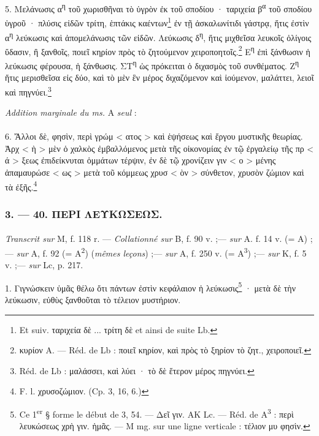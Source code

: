 \documentclass[a4paper, 11pt, oneside, polutonikogreek, french]{article}
\begin{document}
5. Μελάνωσις α\textsuperscript{η} τοῦ χωρισθῆναι τὸ ὑγρὸν ἐκ τοῦ σποδίου · ταριχεία β\textsuperscript{α} τοῦ σποδίου ὑγροῦ · πλύσις εἰδῶν τρίτη, ἑπτάκις καέντων\footnote{Et suiv. ταριχεία δὲ ... τρίτη δὲ et ainsi de suite Lb.} ἐν τῇ ἀσκαλωνίτιδι γάστρᾳ, ἥτις ἐστὶν α\textsuperscript{η} λεύκωσις καὶ ἀπομελάνωσις τῶν εἰδῶν. Λεύκωσις δ\textsuperscript{η}, ἥτις μιχθεῖσα λευκοῖς ὀλίγοις ὕδασιν, ἢ ξανθοῖς, ποιεῖ κηρίον πρὸς τὸ ζητούμενον χειροποητοῖς.\footnote{κυρίον A. --- Réd. de Lb : ποιεῖ κηρίον, καὶ πρὸς τὸ ξηρίον τὸ ζητ., χειροποιεῖ.} Ε\textsuperscript{η} ἐπὶ ξάνθωσιν ἡ λεύκωσις φέρουσα, ἡ ξάνθωσις. ΣΤ\textsuperscript{η} ὡς πρόκειται ὁ διχασμὸς τοῦ συνθέματος. Ζ\textsuperscript{η} ἥτις μερισθεῖσα εἰς δύο, καὶ τὸ μὲν ἓν μέρος διχαζόμενον καὶ ἰούμενον, μαλάττει, λειοῖ καὶ πηγνύει.\footnote{Réd. de Lb : μαλάσσει, καὶ λύει · τὸ δὲ ἕτερον μέρος πηγνύει.}
\begin{center}
\emph{Addition marginale du ms.} A \emph{seul} :
\end{center}
\paragraph{}
6. Ἄλλοι δὲ, φησὶν, περὶ γρώμ < ατος > καὶ ἑψήσεως καὶ ἔργου μυστικῆς θεωρίας. Ἀρχ < ὴ > μὲν ὁ χαλκὸς ἐμβαλλόμενος μετὰ τῆς οἰκονομίας ἐν τῷ ἐργαλείῳ τῆς πρ < ά > ξεως ἐπιδείκνυται ὁμμάτων τέρψιν, ἐν δὲ τῷ χρονίζειν γιν < ο > μένης ἀπαμαυρώσε < ως > μετὰ τοῦ κόμμεως χρυσ < ὸν > σύνθετον, χρυσὸν ζώμιον καὶ τὰ ἐξῆς.\footnote{F. l. χρυσοζώμιον. (Cp. 3, 16, 6.)}

\bigskip
\centerline{\EightStarTaper}
\centerline{\EightStarTaper\EightStarTaper}
\bigskip

\subsubsection{3. --- 40. ΠΕΡΙ ΛΕΥΚΩΣΕΩΣ.}
\paragraph{}
\emph{Transcrit sur} M, f. 118 r. --- \emph{Collationné sur} B, f. 90 v. ;--- \emph{sur} A. f. 14 v. (= A) ;--- \emph{sur} A, f. 92 (= A\textsuperscript{2}) (\emph{mêmes leçons}) ;--- \emph{sur} A, f. 250 v. (= A\textsuperscript{3}) ;--- \emph{sur} K, f. 5 v. ;--- \emph{sur} Lc, p. 217.

\bigskip

1. Γιγνώσκειν ὑμᾶς θέλω ὅτι πάντων ἐστὶν κεφάλαιον ἡ λεύκωσις\footnote{Ce 1\textsuperscript{er} § forme le début de 3, 54. --- Δεῖ γιν. AK Lc. --- Réd. de A\textsuperscript{3} : περὶ λευκώσεως χρὴ γιν. ἡμᾶς. --- M mg. sur une ligne verticale : τέλιον μυ φησὶν.} · μετὰ δὲ τὴν λεύκωσιν, εὐθὺς ξανθοῦται τὸ τέλειον μυστήριον.
\end{document}
